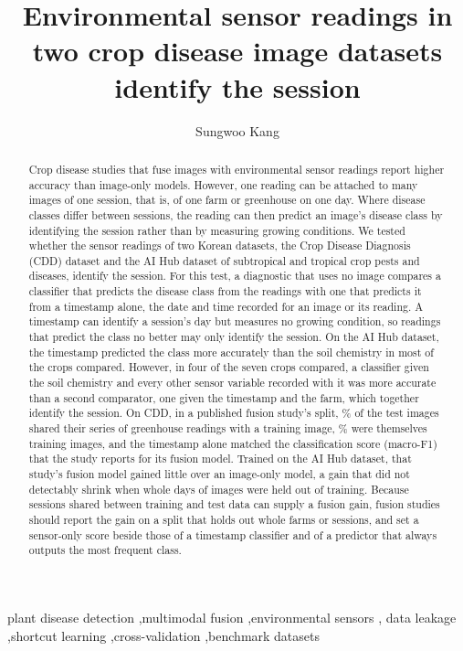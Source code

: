 \documentclass[preprint,12pt,authoryear,nopreprintline]{elsarticle}
\begin{document}
\begin{frontmatter}

\title{Environmental sensor readings in two crop disease image datasets identify
the session}

\author[a]{Sungwoo Kang}

\begin{abstract}
Crop disease studies that fuse images with environmental sensor readings report
higher accuracy than image-only models. However, one reading can be attached to many
images of one session, that is, of one farm or greenhouse on one day. Where disease
classes differ between sessions, the reading can then predict an image's disease class
by identifying the session rather than by measuring growing conditions. We tested
whether the sensor readings of two Korean datasets, the Crop Disease Diagnosis (CDD)
dataset and the AI Hub dataset of subtropical and tropical crop pests and diseases,
identify the session. For this test, a diagnostic that uses no image compares a classifier that predicts the
disease class from the readings with one that predicts it from a timestamp alone, the
date and time recorded for an image or its reading. A timestamp can identify a session's
day but measures no growing condition, so readings that predict the class no better
may only identify the session.  On the AI Hub
dataset, the timestamp predicted the class more accurately than the soil chemistry in
most of the crops compared. However, in four of the seven crops compared, a classifier given the soil chemistry and every other
sensor variable recorded with it was more accurate than a second comparator, one given
the timestamp and the farm, which together identify the session. On CDD, in a published fusion study's split, \cddLeak{}\% of the test
images shared their series of greenhouse readings with a
training image, \cddDirectTest{}\% were themselves training images, and the timestamp
alone matched the classification score (macro-F1) that the study reports for its
fusion model. Trained on the AI Hub
dataset, that study's fusion model gained little over an image-only model, a gain that did not
detectably shrink when whole days of images were held out of training. Because sessions shared
between training and test data can supply a fusion gain, fusion studies should report
the gain on a
split that holds out whole farms or sessions, and set a sensor-only score beside those of a timestamp classifier and of a predictor
that always outputs the most frequent class.
\end{abstract}

\begin{keyword}
plant disease detection \sep multimodal fusion \sep environmental sensors \sep
data leakage \sep shortcut learning \sep cross-validation \sep benchmark datasets
\end{keyword}

\end{frontmatter}
\end{document}
